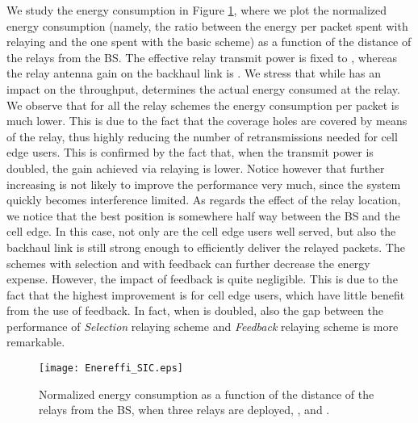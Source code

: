 \documentclass[12pt, letterpaper, onecolumn, draftcls]{IEEEtran}
\newcommand{\figw}{0.55\columnwidth}
\begin{document}
We study the energy consumption in Figure \ref{fig:Enereffi_SIC}, where we plot the normalized energy consumption (namely, the ratio between the energy per packet spent with relaying and the one spent with the basic scheme) as a function of the distance of the relays from the BS. The effective relay transmit power is fixed to , whereas the relay antenna gain on the backhaul link is .
We stress that while  has an impact on the throughput,  determines the actual energy consumed at the relay. We observe that for all the relay schemes the energy consumption per packet is much lower. This is due to the fact that the coverage holes are covered by means of the relay, thus highly reducing the number of retransmissions needed for cell edge users. This is confirmed by the fact that, when the transmit power  is doubled, the gain achieved via relaying is lower.
Notice however that further increasing  is not likely to improve the performance very much, since the system quickly becomes interference limited.
As regards the effect of the relay location, we notice that the best position is somewhere half way between the BS and the cell edge. In this case, not only are the cell edge users well served, but also the backhaul link is still strong enough to efficiently deliver the relayed packets.
The schemes with selection and with feedback can further decrease the energy expense. However, the impact of feedback is quite negligible. This is due to the fact that the highest improvement is for cell edge users, which have little benefit from the use of feedback. In fact, when  is doubled, also the gap between the performance of \textit{Selection} relaying scheme and \textit{Feedback} relaying scheme is more remarkable.
\begin{figure}
    \centering
    \texttt{[image: Enereffi\_SIC.eps]}
     \caption{\small Normalized energy consumption as a function of the distance of the relays from the BS, when three relays are deployed, , and .}
     \vspace{-1cm}
  \label{fig:Enereffi_SIC}
\end{figure}
\end{document}
